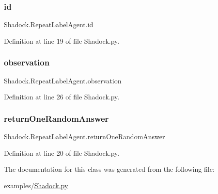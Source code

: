 \subsubsection{\texorpdfstring{id}{id}}
{\footnotesize\ttfamily Shadock.\+Repeat\+Label\+Agent.\+id}



Definition at line 19 of file Shadock.\+py.

\mbox{\label{classShadock_1_1RepeatLabelAgent_a690dbe29c2e66b970dfd43046790f2b0}} 
\subsubsection{\texorpdfstring{observation}{observation}}
{\footnotesize\ttfamily Shadock.\+Repeat\+Label\+Agent.\+observation}



Definition at line 26 of file Shadock.\+py.

\mbox{\label{classShadock_1_1RepeatLabelAgent_af5000a81304581727384cf2546b5a238}} 
\subsubsection{\texorpdfstring{return\+One\+Random\+Answer}{returnOneRandomAnswer}}
{\footnotesize\ttfamily Shadock.\+Repeat\+Label\+Agent.\+return\+One\+Random\+Answer}



Definition at line 20 of file Shadock.\+py.



The documentation for this class was generated from the following file\+:\begin{DoxyCompactItemize}
\item 
examples/\hyperlink{Shadock_8py}{Shadock.\+py}\end{DoxyCompactItemize}
